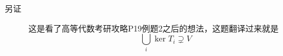 \begin{enumerate}
\begin{description}
\item[另证] 这是看了高等代数考研攻略P19例题2之后的想法，这题翻译过来就是
\[
\bigcup_i \ker T_i \supsetneq V
\]












\end{description}
\end{enumerate}